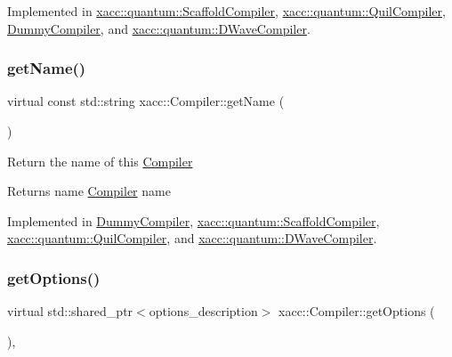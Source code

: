 Implemented in \hyperlink{a01103_a3736ecc229fe6acdd4c991e85d7a1f08}{xacc\+::quantum\+::\+Scaffold\+Compiler}, \hyperlink{a01075_adf4d321ecb0df3fa7728999f941c83b2}{xacc\+::quantum\+::\+Quil\+Compiler}, \hyperlink{a01139_a2f9bb3d30bb11f12b530854a11c8fb25}{Dummy\+Compiler}, and \hyperlink{a01115_a893e1d1c81a8aaf6e2435c9bceab575e}{xacc\+::quantum\+::\+D\+Wave\+Compiler}.

\mbox{\label{a01451_a87fca9100e6462122f5b687c3a0fb3fb}} 
\subsubsection{\texorpdfstring{get\+Name()}{getName()}}
{\footnotesize\ttfamily virtual const std\+::string xacc\+::\+Compiler\+::get\+Name (\begin{DoxyParamCaption}{ }\end{DoxyParamCaption})\hspace{0.3cm}{\ttfamily [pure virtual]}}

Return the name of this \hyperlink{a01451}{Compiler} \begin{DoxyReturn}{Returns}
name \hyperlink{a01451}{Compiler} name 
\end{DoxyReturn}


Implemented in \hyperlink{a01139_a76460cb78671dc2cf42f2bebf8fb80c7}{Dummy\+Compiler}, \hyperlink{a01103_a3f537054a3924a1d14f4ceb0f0181161}{xacc\+::quantum\+::\+Scaffold\+Compiler}, \hyperlink{a01075_ae7d52140b6dd52730edc6e38ae48f437}{xacc\+::quantum\+::\+Quil\+Compiler}, and \hyperlink{a01115_a8a180031ae563e1a9aac611e8066c181}{xacc\+::quantum\+::\+D\+Wave\+Compiler}.

\mbox{\label{a01451_a9f5a8965c9c2dd895016d18264ebbe92}} 
\subsubsection{\texorpdfstring{get\+Options()}{getOptions()}}
{\footnotesize\ttfamily virtual std\+::shared\+\_\+ptr$<$options\+\_\+description$>$ xacc\+::\+Compiler\+::get\+Options (\begin{DoxyParamCaption}{ }\end{DoxyParamCaption})\hspace{0.3cm}{\ttfamily [inline]}, {\ttfamily [virtual]}}

